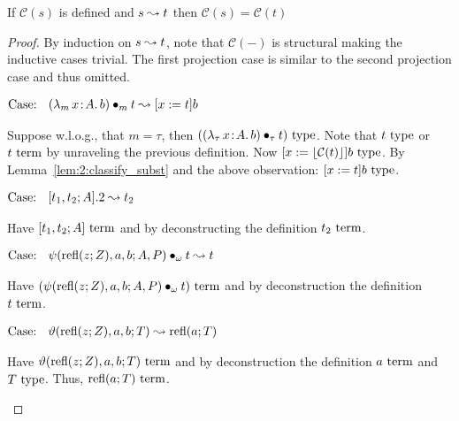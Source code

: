 \begin{lemma}
    \label{lem:2:classify_preservation_step}
    If $\mathcal{C}(s)$ is defined and $s \leadsto t$ then $\mathcal{C}(s) = \mathcal{C}(t)$
\end{lemma}
\begin{proof}
    By induction on $s \leadsto t$, note that $\mathcal{C}(-)$ is structural making the inductive cases trivial.
    The first projection case is similar to the second projection case and thus omitted.

    $\text{Case: }\begin{array}{c} ({\lambda_m}\, x\! : \! A.\, b) \bullet_{m} t \leadsto [x := t]b \end{array}$
    \begin{proofcase}
        Suppose w.l.o.g., that $m = \tau$, then $(({\lambda_\tau}\, x\! : \! A.\, b) \bullet_{\tau} t)~\textnormal{type}$.
        Note that $t~\textnormal{type}$ or $t~\textnormal{term}$ by unraveling the previous definition.
        Now $[x := \lfloor \mathcal{C}(t) \rfloor]b~\textnormal{type}$.
        By Lemma~\ref{lem:2:classify_subst} and the above observation: $[x := t]b~\textnormal{type}$.
    \end{proofcase}

    $\text{Case: }\begin{array}{c} [t_1, t_2; A].2 \leadsto t_2 \end{array}$
    \begin{proofcase}
        Have $[t_1, t_2; A]~\textnormal{term}$ and by deconstructing the definition $t_2~\textnormal{term}$.
    \end{proofcase}

    $\text{Case: }\begin{array}{c} \psi(\text{refl}(z; Z), a, b; A, P) \bullet_{\omega} t \leadsto t \end{array}$
    \begin{proofcase}
        Have $(\psi(\text{refl}(z; Z), a, b; A, P) \bullet_{\omega} t)~\textnormal{term}$ and by deconstruction the definition $t~\textnormal{term}$.
    \end{proofcase}

    $\text{Case: }\begin{array}{c} \vartheta(\text{refl}(z; Z), a, b; T) \leadsto \text{refl}(a; T) \end{array}$
    \begin{proofcase}
        Have $\vartheta(\text{refl}(z; Z), a, b; T)~\textnormal{term}$ and by deconstruction the definition $a~\textnormal{term}$ and $T~\textnormal{type}$.
        Thus, $\text{refl}(a; T)~\textnormal{term}$.
    \end{proofcase}
\end{proof}

